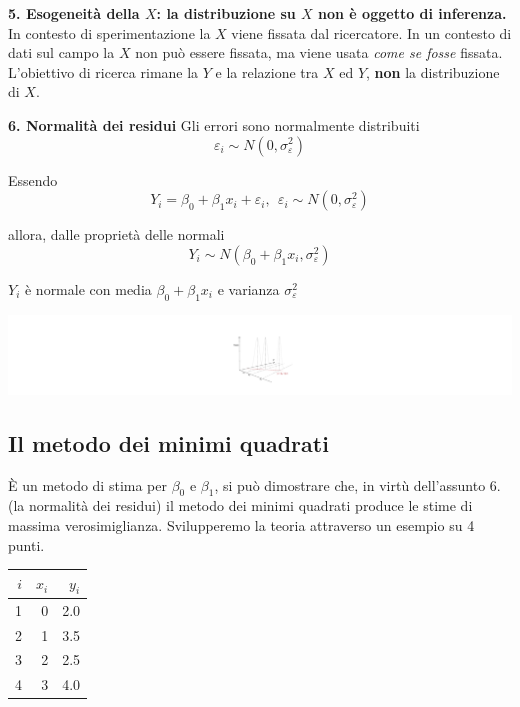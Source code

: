 \documentclass[
  11pt,
]{book}
\theoremstyle{mytheoremstyle}
\theoremstyle{mydefstyle}
\begin{document}
\textbf{5. Esogeneità della \(X\): la distribuzione su \(X\) non è oggetto di inferenza.}
In contesto di sperimentazione la \(X\) viene fissata dal ricercatore.
In un contesto di dati sul campo la \(X\) non può essere fissata, ma viene usata
\emph{come se fosse} fissata.
L'obiettivo di ricerca rimane la \(Y\) e la relazione tra \(X\) ed \(Y\), \textbf{non}
la distribuzione di \(X\).

\textbf{6. Normalità dei residui}
Gli errori sono normalmente distribuiti
\[\varepsilon_i\sim N\left(0,\sigma_\varepsilon^2\right)\]

Essendo
\[Y_i = \beta_0+\beta_1x_i+\varepsilon_i, ~~\varepsilon_i\sim N\left(0,\sigma_\varepsilon^2\right)\]

allora, dalle proprietà delle normali
\[Y_i\sim  N\left(\beta_0+\beta_1x_i,\sigma_\varepsilon^2\right)\]

\(Y_i\) è normale con media \(\beta_0+\beta_1x_i\) e varianza \(\sigma_\varepsilon^2\)

\begin{center}\includegraphics{Appunti_di_Statistica_2025_files/figure-latex/17-regressione-I-28-1} \end{center}

\subsection{Il metodo dei minimi quadrati}\label{il-metodo-dei-minimi-quadrati}

È un metodo di stima per \(\beta_0\) e \(\beta_1\), si può dimostrare che, in virtù
dell'assunto 6. (la normalità dei residui) il metodo dei minimi quadrati produce le
stime di massima verosimiglianza. Svilupperemo la teoria attraverso un esempio su 4 punti.

\begin{tabular}{rrr}
\toprule
$i$ & $x_i$ & $y_i$\\
\midrule
1 & 0 & 2.0\\
2 & 1 & 3.5\\
3 & 2 & 2.5\\
4 & 3 & 4.0\\
\bottomrule
\end{tabular}
\end{document}
